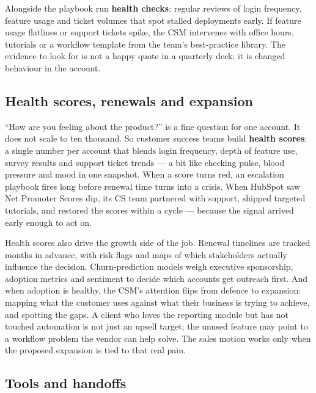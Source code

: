 Alongside the playbook run \textbf{health checks}: regular reviews of login frequency, feature usage and ticket volumes that spot stalled deployments early. If feature usage flatlines or support tickets spike, the CSM intervenes with office hours, tutorials or a workflow template from the team's best-practice library. The evidence to look for is not a happy quote in a quarterly deck; it is changed behaviour in the account.



\subsection{Health scores, renewals and expansion}


``How are you feeling about the product?'' is a fine question for one account. It does not scale to ten thousand. So customer success teams build \textbf{health scores}: a single number per account that blends login frequency, depth of feature use, survey results and support ticket trends — a bit like checking pulse, blood pressure and mood in one snapshot. When a score turns red, an escalation playbook fires long before renewal time turns into a crisis. When HubSpot saw Net Promoter Scores dip, its CS team partnered with support, shipped targeted tutorials, and restored the scores within a cycle — because the signal arrived early enough to act on.


Health scores also drive the growth side of the job. Renewal timelines are tracked months in advance, with risk flags and maps of which stakeholders actually influence the decision. Churn-prediction models weigh executive sponsorship, adoption metrics and sentiment to decide which accounts get outreach first. And when adoption is healthy, the CSM's attention flips from defence to expansion: mapping what the customer uses against what their business is trying to achieve, and spotting the gaps. A client who loves the reporting module but has not touched automation is not just an upsell target; the unused feature may point to a workflow problem the vendor can help solve. The sales motion works only when the proposed expansion is tied to that real pain.



\subsection{Tools and handoffs}


